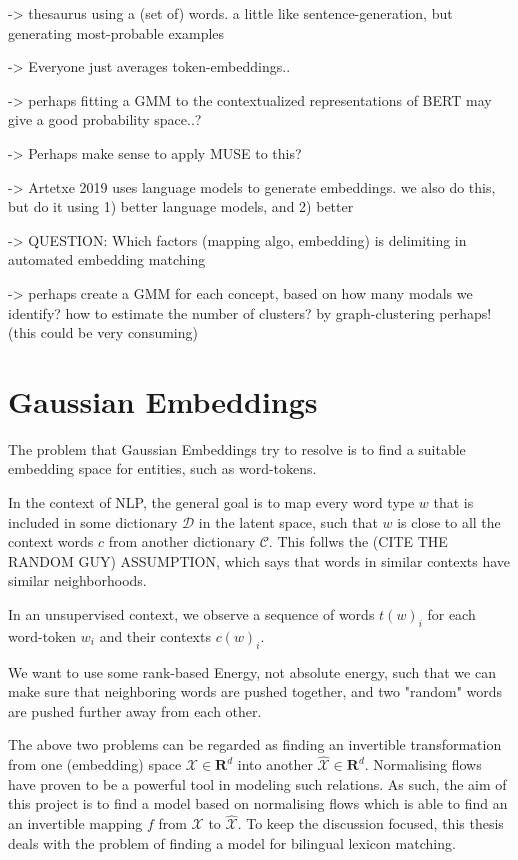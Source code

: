 \documentclass[a4paper,12pt,twoside,openright]{report}
\begin{document}
-> thesaurus using a (set of) words. a little like sentence-generation, but generating most-probable examples

-> Everyone just averages token-embeddings..

-> perhaps fitting a GMM to the contextualized representations of BERT may give a good probability space..?

-> Perhaps make sense to apply MUSE to this?

-> Artetxe 2019 uses language models to generate embeddings. we also do this, but do it using 1) better language models, and 2) better 

-> QUESTION: Which factors (mapping algo, embedding) is delimiting in automated embedding matching

-> perhaps create a GMM for each concept, based on how many modals we identify? how to estimate the number of clusters? by graph-clustering perhaps! (this could be very consuming)

\section{Gaussian Embeddings}

The problem that Gaussian Embeddings try to resolve is to find a suitable embedding space for entities, such as word-tokens.

In the context of NLP, the general goal is to map every word type $w$ that is included in some dictionary $\mathcal{D}$ in the latent space, such that $w$ is close to all the context words $c$ from another dictionary $\mathcal{C}$.
This follws the (CITE THE RANDOM GUY) ASSUMPTION, which says that words in similar contexts have similar neighborhoods.

In an unsupervised context, we observe a sequence of words ${t(w)_i}$ for each word-token $w_i$ and their contexts $c(w)_i$.

We want to use some rank-based Energy, not absolute energy, such that we can make sure that neighboring words are pushed together, and two "random" words are pushed further away from each other.

The above two problems can be regarded as finding an invertible transformation from one (embedding) space $\mathcal{X} \in \mathbf{R}^d$ into another $\mathcal{\hat{X}} \in \mathbf{R}^d$. 
Normalising flows \cite{variational_inference_using_normalized_flows} \cite{nvp} have proven to be a powerful tool in modeling such relations.
As such, the aim of this project is to find a model based on normalising flows which is able to find an an invertible mapping $f$ from $\mathcal{X}$ to $\mathcal{\hat{X}}$.
To keep the discussion focused, this thesis deals with the problem of finding a model for bilingual lexicon matching.
\end{document}

